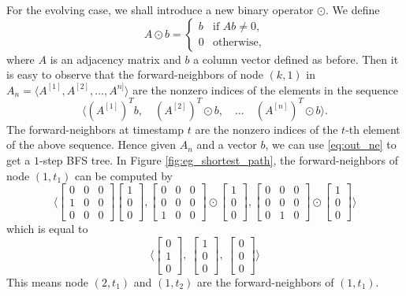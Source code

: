 \documentclass[11pt, conference, , compsocconf]{IEEEtran}
\theoremstyle{definition}
\begin{document}
For the evolving case, we shall introduce a new binary operator $\odot$.
We define
\[
A \odot b = 
\begin{cases}
b & \mbox{if $Ab \ne 0$,} \\
0 & \mbox{otherwise,}
\end{cases}
\]
where $A$ is an adjacency matrix and $b$ a column vector defined as before.
Then it is easy to observe that 
the forward-neighbors of node $(k, 1)$ in $A_n = \langle A^{[1]}, A^{[2]}, \ldots, A^{n]}\rangle$ are the nonzero indices of the 
elements in the sequence
\begin{equation}
\label{eq:out_ne}
\big\langle (A^{[1]})^Tb, \quad  (A^{[2]})^T\odot b, \quad \ldots \quad (A^{[n]})^T\odot b \big\rangle.
\end{equation}
The forward-neighbors at timestamp $t$ are the nonzero indices of the $t$-th element of the above sequence.
Hence given $A_n$ and a vector $b$, we can use \eqref{eq:out_ne} to 
get a $1$-step  BFS tree. In Figure \ref{fig:eg_shortest_path}, the forward-neighbors
of node $(1, t_1)$ can be computed by
\[
\Big\langle
  \begin{bmatrix} 
    0 & 0 & 0 \\
    1 & 0 & 0 \\
    0 & 0 & 0
  \end{bmatrix} 
\begin{bmatrix}
1 \\
0 \\
0
\end{bmatrix}
,
 \begin{bmatrix}
   0 & 0 & 0 \\
   0 & 0 & 0 \\
   1 & 0 & 0 
 \end{bmatrix}
\odot
\begin{bmatrix}
1 \\
0 \\
0
\end{bmatrix}
,
 \begin{bmatrix}
  0 & 0 & 0 \\
  0 & 0 & 0 \\
  0 & 1 & 0 
 \end{bmatrix}
\odot
\begin{bmatrix}
1 \\
0 \\
0
\end{bmatrix}
\Big\rangle
\]
which is equal to 
\[
\Big\langle
\begin{bmatrix}
0 \\
1 \\
0
\end{bmatrix},~
\begin{bmatrix}
1 \\
0 \\
0
\end{bmatrix},~
\begin{bmatrix}
0 \\
0 \\
0
\end{bmatrix}
\Big\rangle
\]
This means node $(2,t_1)$ and $(1,t_2)$ are the forward-neighbors of $(1,t_1)$. 
\end{document}
